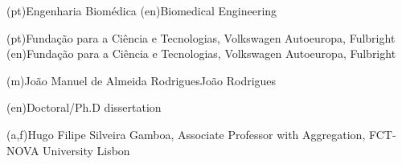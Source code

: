 \ntspecialization*(pt){Engenharia Biomédica}
\ntspecialization*(en){Biomedical Engineering}

\ntsponsors(pt){Fundação para a Ciência e Tecnologias, Volkswagen Autoeuropa, Fulbright}
\ntsponsors(en){Fundação para a Ciência e Tecnologias, Volkswagen Autoeuropa, Fulbright}

\ntauthorname(m){João Manuel de Almeida Rodrigues}{João Rodrigues}

\ntauthordegree(en){Doctoral/Ph.D dissertation}


(a,f){Hugo Filipe Silveira Gamboa, Associate Professor with Aggregation, FCT-NOVA University Lisbon}

